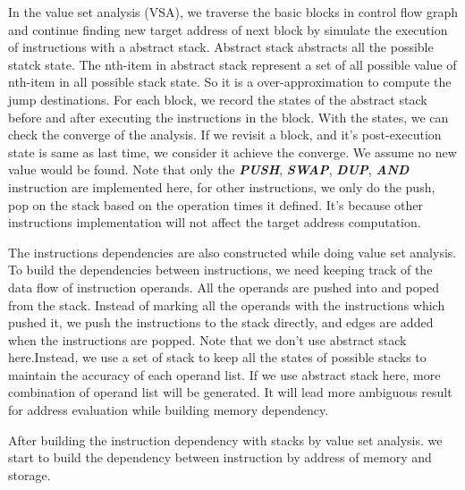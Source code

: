 \documentclass{article}
\begin{document}
In the value set analysis (VSA), we traverse the basic blocks in control flow graph and continue finding new target address of next block by simulate the execution of instructions with a abstract stack. Abstract stack abstracts all the possible statck state. The nth-item in abstract stack represent a set of all possible value of nth-item in all possible stack state. So it is a over-approximation to compute the jump destinations. For each block, we record the states of the abstract stack before and after executing the instructions in the block. With the states, we can check the converge of the analysis. If we revisit a block, and it's post-execution state is same as last time, we consider it achieve the converge. We assume no new value would be found. Note that only the \textbf{\textit{PUSH}}, \textbf{\textit{SWAP}}, \textbf{\textit{DUP}}, \textbf{\textit{AND}} instruction are implemented here, for other instructions, we only do the push, pop on the stack based on the operation times it defined. It's because other instructions implementation will not affect the target address computation.

The instructions dependencies are also constructed while doing value set analysis. To build the dependencies between instructions, we need keeping track of the data flow of instruction operands. All the operands are pushed into and poped from the stack. Instead of marking all the operands with the instructions which pushed it, we push the instructions to the stack directly, and edges are added when the instructions are popped. Note that we don't use abstract stack here.Instead, we use a set of stack to keep all the states of possible stacks to maintain the accuracy of each operand list. If we use abstract stack here, more combination of operand list will be generated. It will lead more ambiguous result for address evaluation while building memory dependency.

After building the instruction dependency with stacks by value set analysis. we start to build the dependency between instruction by address of memory and storage.
\end{document}
